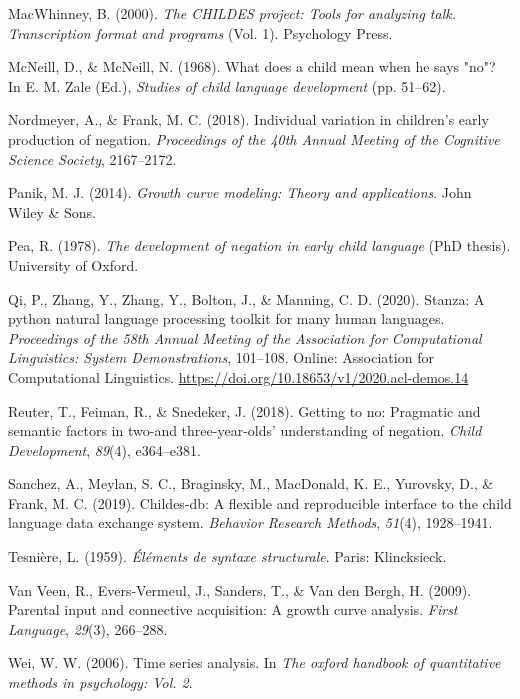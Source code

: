 \documentclass[
  man,floatsintext]{apa6}
\newlength{\cslhangindent}
\newlength{\cslentryspacingunit} %
\newenvironment{CSLReferences}[2] %
 {%
  \setlength{\parindent}{0pt}
  \ifodd #1
  \let\oldpar\par
  \def\par{\hangindent=\cslhangindent\oldpar}
  \fi
  \setlength{\parskip}{#2\cslentryspacingunit}
 }%
 {}
\begin{document}
\begin{CSLReferences}{1}{0}
\leavevmode{}%
MacWhinney, B. (2000). \emph{The CHILDES project: Tools for analyzing talk. Transcription format and programs} (Vol. 1). Psychology Press.

\leavevmode{}%
McNeill, D., \& McNeill, N. (1968). What does a child mean when he says "no"? In E. M. Zale (Ed.), \emph{Studies of child language development} (pp. 51--62).

\leavevmode{}%
Nordmeyer, A., \& Frank, M. C. (2018). Individual variation in children's early production of negation. \emph{Proceedings of the 40th Annual Meeting of the Cognitive Science Society}, 2167--2172.

\leavevmode{}%
Panik, M. J. (2014). \emph{Growth curve modeling: Theory and applications}. John Wiley \& Sons.

\leavevmode{}%
Pea, R. (1978). \emph{The development of negation in early child language} (PhD thesis). University of Oxford.

\leavevmode{}%
Qi, P., Zhang, Y., Zhang, Y., Bolton, J., \& Manning, C. D. (2020). {S}tanza: A python natural language processing toolkit for many human languages. \emph{Proceedings of the 58th Annual Meeting of the Association for Computational Linguistics: System Demonstrations}, 101--108. Online: Association for Computational Linguistics. \url{https://doi.org/10.18653/v1/2020.acl-demos.14}

\leavevmode{}%
Reuter, T., Feiman, R., \& Snedeker, J. (2018). Getting to no: Pragmatic and semantic factors in two-and three-year-olds' understanding of negation. \emph{Child Development}, \emph{89}(4), e364--e381.

\leavevmode{}%
Sanchez, A., Meylan, S. C., Braginsky, M., MacDonald, K. E., Yurovsky, D., \& Frank, M. C. (2019). Childes-db: A flexible and reproducible interface to the child language data exchange system. \emph{Behavior Research Methods}, \emph{51}(4), 1928--1941.

\leavevmode{}%
Tesnière, L. (1959). \emph{{É}l{é}ments de syntaxe structurale}. Paris: Klincksieck.

\leavevmode{}%
Van Veen, R., Evers-Vermeul, J., Sanders, T., \& Van den Bergh, H. (2009). Parental input and connective acquisition: A growth curve analysis. \emph{First Language}, \emph{29}(3), 266--288.

\leavevmode{}%
Wei, W. W. (2006). Time series analysis. In \emph{The oxford handbook of quantitative methods in psychology: Vol. 2}.

\end{CSLReferences}
\end{document}
